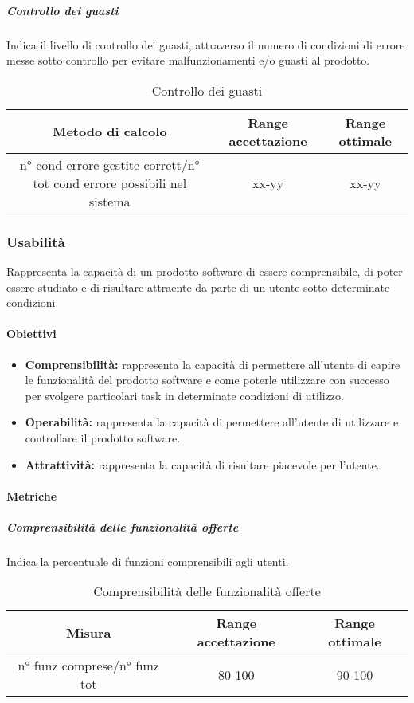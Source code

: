 			\subparagraph{Controllo dei guasti}
			Indica il livello di controllo dei guasti, attraverso il numero di condizioni di errore messe sotto controllo per evitare malfunzionamenti e/o guasti al prodotto.
			\begin{table}[H]
				\begin{center}
					\begin{tabular}{|c|c|c|}
						\hline
						\textbf{Metodo di calcolo} & \textbf{Range accettazione} & \textbf{Range ottimale} \\
						\hline
						n° cond errore gestite corrett/n° tot cond errore possibili nel sistema & xx-yy  & xx-yy \\
						\hline
					\end{tabular}
				\end{center}
				\caption{Controllo dei guasti}
			\end{table}
	
	\subsubsection{Usabilità}
	Rappresenta la capacità di un prodotto software di essere comprensibile, di poter essere studiato e di risultare attraente da parte di un utente sotto determinate condizioni.
	
		\paragraph{Obiettivi}
			\begin{itemize}
				\item \textbf{Comprensibilità:} rappresenta la capacità di permettere all'utente di capire le funzionalità del prodotto software e come poterle utilizzare con successo per svolgere particolari task in determinate condizioni di utilizzo.
				\item \textbf{Operabilità:} rappresenta la capacità di permettere all'utente di utilizzare e controllare il prodotto software.
				\item \textbf{Attrattività:} rappresenta la capacità di risultare piacevole per l'utente.
			\end{itemize}
		
		\paragraph{Metriche}
			\subparagraph{Comprensibilità delle funzionalità offerte}
			Indica la percentuale di funzioni comprensibili agli utenti.
			\begin{table}[H]
				\begin{center}
					\begin{tabular}{|c|c|c|}
						\hline
						\textbf{Misura} & \textbf{Range accettazione} & \textbf{Range ottimale} \\
						\hline
						n° funz comprese/n° funz tot & 80-100  & 90-100 \\
						\hline
					\end{tabular}
				\end{center}
				\caption{Comprensibilità delle funzionalità offerte}
			\end{table}
		
